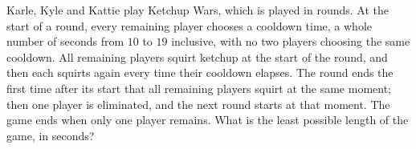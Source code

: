 Karle, Kyle and Kattie play Ketchup Wars, which is played in rounds. At the start of a round, every remaining player chooses a cooldown time, a whole number of seconds from $10$ to $19$ inclusive, with no two players choosing the same cooldown. All remaining players squirt ketchup at the start of the round, and then each squirts again every time their cooldown elapses. The round ends the first time after its start that all remaining players squirt at the same moment; then one player is eliminated, and the next round starts at that moment. The game ends when only one player remains. What is the least possible length of the game, in seconds?
